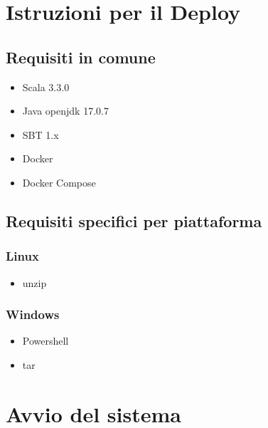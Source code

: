 \documentclass{scrartcl}
\begin{document}
\section{Istruzioni per il Deploy}

%
%

\subsection{Requisiti in comune}
\begin{itemize}
    \item Scala 3.3.0
    \item Java openjdk 17.0.7
    \item SBT 1.x
    \item Docker
    \item Docker Compose
\end{itemize}

\subsection{Requisiti specifici per piattaforma}
\subsubsection{Linux}
\begin{itemize}
    \item unzip
\end{itemize}

\subsubsection{Windows}
\begin{itemize}
    \item Powershell
    \item tar
\end{itemize}

\section{Avvio del sistema}


\end{document}
